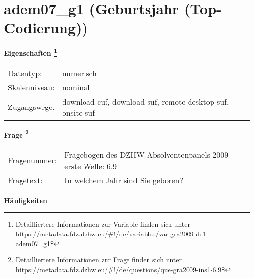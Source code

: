 
    \setcounter{footnote}{0}

    \vspace*{-1.8cm}
	\section{adem07\_g1 (Geburtsjahr (Top-Codierung))}
	\label{section:adem07_g1}



    \vspace*{0.5cm}
    \noindent\textbf{Eigenschaften
	\footnote{Detailliertere Informationen zur Variable finden sich unter
		\url{https://metadata.fdz.dzhw.eu/\#!/de/variables/var-gra2009-ds1-adem07_g1$}}}\\
	\begin{tabularx}{\hsize}{@{}lX}
	Datentyp: & numerisch \\
	Skalenniveau: & nominal \\
	Zugangswege: &
	  download-cuf, 
	  download-suf, 
	  remote-desktop-suf, 
	  onsite-suf
 \\
    \end{tabularx}



				\vspace*{0.5cm}
                \noindent\textbf{Frage
	                \footnote{Detailliertere Informationen zur Frage finden sich unter
		              \url{https://metadata.fdz.dzhw.eu/\#!/de/questions/que-gra2009-ins1-6.9$}}}\\
				\begin{tabularx}{\hsize}{@{}lX}
					Fragenummer: &
					  Fragebogen des DZHW-Absolventenpanels 2009 - erste Welle:
					  6.9
 \\
					Fragetext: & In welchem Jahr sind Sie geboren? \\
				\end{tabularx}





        		\vspace*{0.5cm}
                \noindent\textbf{Häufigkeiten}

